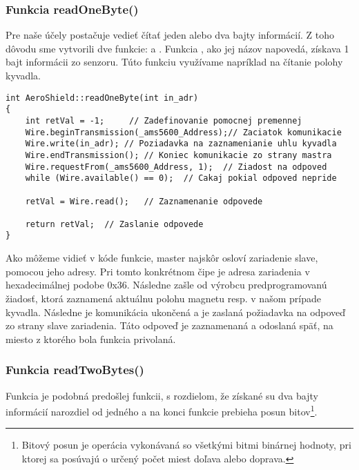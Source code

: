 \subsubsection{Funkcia readOneByte()}

Pre naše účely postačuje vedieť čítať jeden alebo dva bajty informácií. Z toho dôvodu sme vytvorili dve funkcie:  a \newline{}. Funkcia , ako jej názov napovedá, získava 1 bajt informácii zo senzoru. Túto funkciu využívame napríklad na čítanie polohy kyvadla. 

\begin{lstlisting}[caption={Zdrojový kód funkcie readOneByte.},captionpos=b]
int AeroShield::readOneByte(int in_adr)         
{
	int retVal = -1;	 // Zadefinovanie pomocnej premennej
	Wire.beginTransmission(_ams5600_Address);// Zaciatok komunikacie 
	Wire.write(in_adr);	// Poziadavka na zaznamenianie uhlu kyvadla 
	Wire.endTransmission();	// Koniec komunikacie zo strany mastra
	Wire.requestFrom(_ams5600_Address, 1);	// Ziadost na odpoved  
	while (Wire.available() == 0);	// Cakaj pokial odpoved nepride  
	
	retVal = Wire.read();	// Zaznamenanie odpovede 
	
	return retVal;	// Zaslanie odpovede 
}
\end{lstlisting}

Ako môžeme vidieť v kóde funkcie, master najskôr osloví zariadenie slave, pomocou jeho adresy. Pri tomto konkrétnom čipe je adresa zariadenia v hexadecimálnej podobe 0x36. Následne zašle od výrobcu predprogramovanú žiadosť, ktorá zaznamená aktuálnu polohu magnetu resp. v našom prípade kyvadla. Následne je komunikácia ukončená a je zaslaná požiadavka na odpoveď zo strany slave zariadenia. Táto odpoveď je zaznamenaná a odoslaná späť, na miesto z ktorého bola funkcia privolaná.

\subsubsection{Funkcia readTwoBytes()}

Funkcia  je podobná predošlej funkcii, s rozdielom, že získané su dva bajty informácií narozdiel od jedného a na konci funkcie prebieha posun bitov\footnote[7]{Bitový posun je operácia vykonávaná so všetkými bitmi binárnej hodnoty, pri ktorej sa posúvajú o určený počet miest doľava alebo doprava\cite{biteShift}.}. 

